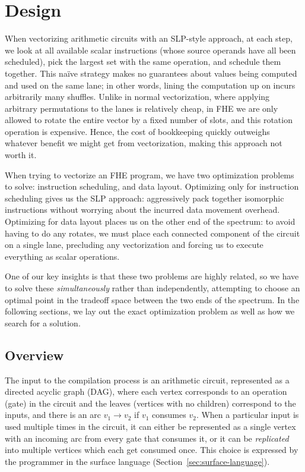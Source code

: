 \section{Design}\label{sec:design}
When vectorizing arithmetic circuits with an SLP-style approach, at each step, we look at all available scalar instructions (whose source operands have all been scheduled), pick the largest set with the same operation, and schedule them together.
This na\"ive strategy makes no guarantees about values being computed and used on the same lane; in other words, lining the computation up on incurs arbitrarily many shuffles.
Unlike in normal vectorization, where applying arbitrary permutations to the lanes is relatively cheap, in FHE we are only allowed to rotate the entire vector by a fixed number of slots, and this rotation operation is expensive.
Hence, the cost of bookkeeping quickly outweighs whatever benefit we might get from vectorization, making this approach not worth it.

When trying to vectorize
an FHE program, we have two optimization problems to solve: instruction scheduling, and data layout.
Optimizing only for instruction scheduling gives us the SLP approach: aggressively pack together isomorphic instructions without worrying about the incurred data movement overhead.
Optimizing for data layout places us on the other end of the spectrum: to avoid having to do any rotates, we must place each connected component of the circuit on a single lane, precluding any vectorization and forcing us to execute everything as scalar operations.

One of our key insights is that these two problems are highly related, so we have to solve these {\em simultaneously} rather than independently, attempting to choose an optimal point in the tradeoff space between the two ends of the spectrum.
In the following sections, we lay out the exact optimization problem as well as how we search for a solution. 

\subsection{Overview}
The input to the compilation process is an arithmetic circuit, represented as a directed acyclic graph (DAG), where each vertex corresponds to an operation (gate) in the circuit and the leaves (vertices with no children) correspond to the inputs, and there is an arc $v_1 \to v_2$ if $v_1$ consumes $v_2$. 
When a particular input is used multiple times in the circuit, it can either be represented as a single vertex with an incoming arc from every gate that consumes it, or it can be {\em replicated} into multiple vertices which each get consumed once.
This choice is expressed by the programmer in the surface language (Section~\ref{sec:surface-language}).

